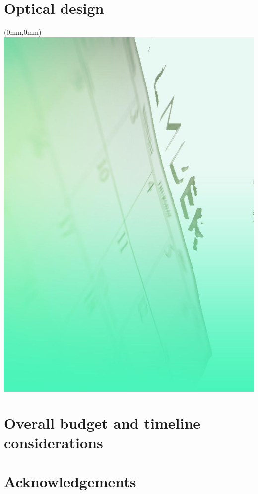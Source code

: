 \documentclass[draft,color,DIV12,pdftex,a4paper]{ET-DS}
\begin{document}
\section{Optical design}

%
%
%
\cleardoublepage 
\FloatBarrier
\begin{textblock*}{297mm}(0mm,0mm)   \includegraphics[width=\paperwidth]{Sec_Conclusions/ConclusionBackgroundImage.jpg}
\end{textblock*}
%
%
\section{Overall budget and timeline considerations}


\cleardoublepage
\FloatBarrier

%
\FloatBarrier
\section{Acknowledgements}
\label{Acknowledgements}

%
\end{document}
